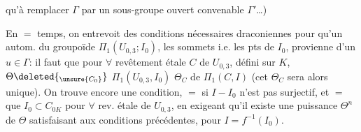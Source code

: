 qu'à remplacer $\Gamma$ par un sous-groupe ouvert convenable $\Gamma'$\ldots)

En $=$ temps, on entrevoit des conditions nécessaires draconiennes pour qu'un autom. \inserted{$\Theta$} du groupoïde $\Pi_1(U_{0,3};I_0)$,   les sommets i.e. les pts de $I_0$, provienne d'un $u\in\Gamma$: il faut que pour $\forall$ revêtement  étale $C$ de $U_{0,3}$, défini sur $K$,      $\Theta\deleted{_{\unsure{C_0}}}$  $\Pi_1(U_{0,3},I_0)$   $\Theta_C$ de $\Pi_1(C,I)$     (cet $\Theta_C$ sera alors unique). On trouve encore une condition, $=$ si $I-I_0$ n'est pas surjectif, et   $=$ que $I_0\subset C_{0K}$ pour $\forall$ rev. étale de $U_{0,3}$, en exigeant qu'il existe une puissance $\Theta^n$ de $\Theta$  satisfaisant aux conditions précédentes, pour $I=f^{-1}(I_0)$.
